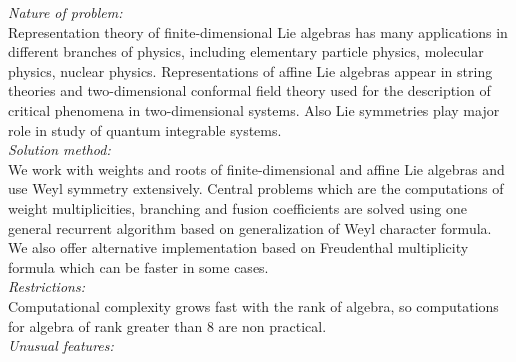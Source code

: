 \documentclass[preprint,12pt]{elsarticle}
\begin{document}
\begin{small}
{\em Nature of problem:}\\
Representation theory of finite-dimensional Lie algebras has many applications in different branches of physics, including elementary particle physics, molecular physics, nuclear physics. Representations of affine Lie algebras appear in string theories and two-dimensional conformal field theory used for the description of critical phenomena in two-dimensional systems. Also Lie symmetries play major role in study of quantum integrable systems. 
   \\
{\em Solution method:}\\
We work with weights and roots of finite-dimensional and affine Lie algebras and use Weyl symmetry extensively. Central problems which are the computations of weight multiplicities, branching and fusion coefficients are solved using one general recurrent algorithm based on generalization of Weyl character formula. We also offer alternative implementation based on Freudenthal multiplicity formula which can be faster in some cases. 
   \\
{\em Restrictions:}\\
Computational complexity grows fast  with the rank of algebra, so computations for algebra of rank greater than 8 are non practical. 
   \\
{\em Unusual features:}\\

\end{small}
\end{document}
